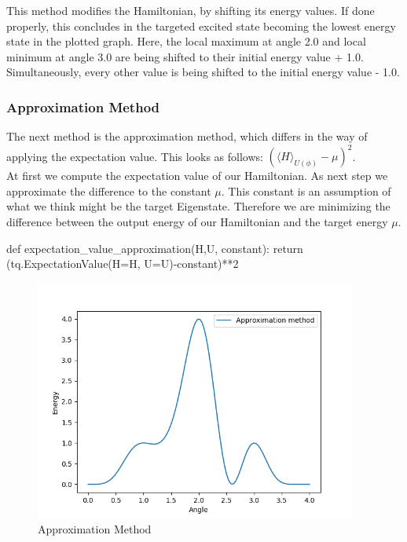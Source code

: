 \documentclass[
  letterpaper,
  DIV=11,
  numbers=noendperiod]{scrartcl}
\newenvironment{Shaded}{\begin{snugshade}}{\end{snugshade}}
\newcommand{\ControlFlowTok}[1]{\textcolor[rgb]{0.00,0.23,0.31}{#1}}
\newcommand{\DecValTok}[1]{\textcolor[rgb]{0.68,0.00,0.00}{#1}}
\newcommand{\KeywordTok}[1]{\textcolor[rgb]{0.00,0.23,0.31}{#1}}
\newcommand{\NormalTok}[1]{\textcolor[rgb]{0.00,0.23,0.31}{#1}}
\newcommand{\OperatorTok}[1]{\textcolor[rgb]{0.37,0.37,0.37}{#1}}
\begin{document}
This method modifies the Hamiltonian, by shifting its energy values. If
done properly, this concludes in the targeted excited state becoming the
lowest energy state in the plotted graph. Here, the local maximum at
angle 2.0 and local minimum at angle 3.0 are being shifted to their
initial energy value + 1.0. Simultaneously, every other value is being
shifted to the initial energy value - 1.0.

\subsubsection{Approximation Method}\label{approximation-method}

The next method is the approximation method, which differs in the way of
applying the expectation value. This looks as follows:
\((\langle H\rangle_{U(\phi)}-\mu)^2\).\\

At first we compute the expectation value of our Hamiltonian. As next
step we approximate the difference to the constant \(\mu\). This
constant is an assumption of what we think might be the target
Eigenstate. Therefore we are minimizing the difference between the
output energy of our Hamiltonian and the target energy \(\mu\).

\begin{Shaded}
\begin{Highlighting}[]
\KeywordTok{def}\NormalTok{ expectation\_value\_approximation(H,U, constant):}
    \ControlFlowTok{return}\NormalTok{ (tq.ExpectationValue(H}\OperatorTok{=}\NormalTok{H, U}\OperatorTok{=}\NormalTok{U)}\OperatorTok{{-}}\NormalTok{constant)}\OperatorTok{**}\DecValTok{2}
\end{Highlighting}
\end{Shaded}

\begin{figure}[H]

{\centering \includegraphics[width=4.16667in,height=\textheight]{Approximation.png}

}

\caption{Approximation Method}

\end{figure}%
\end{document}
